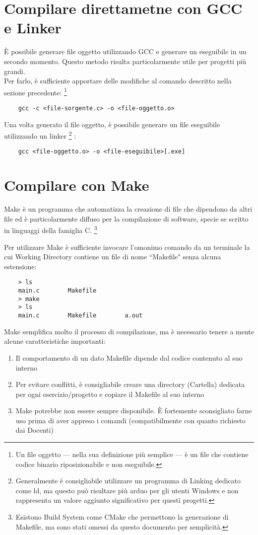 \documentclass{article}
\begin{document}
\section{Compilare direttametne con GCC e Linker}
È possibile generare file oggetto utilizzando GCC e generare un eseguibile in un secondo momento. Questo metodo risulta particolarmente utile per progetti più grandi.  \\
Per farlo, è sufficiente apportare delle modifiche al comando descritto nella sezione precedente:
\footnote{Un file oggetto — nella sua definizione più semplice — è un file che contiene codice binario riposizionabile e non eseguibile.}
\begin{verbatim}
    gcc -c <file-sorgente.c> -o <file-oggetto.o>
\end{verbatim}
Una volta generato il file oggetto, è possibile  generare un file eseguibile utilizzando un linker \footnote{Generalmente è consigliabile utilizzare un programma di Linking dedicato come ld, ma questo può risultare più arduo per gli utenti Windows e non rappresenta un valore aggiunto significativo per questi progetti.}
:
\begin{verbatim}
    gcc <file-oggetto.o> -o <file-eseguibile>[.exe]
\end{verbatim}

\section{Compilare con Make}
Make è un programma che automatizza la creazione di file che dipendono da altri file ed è particolarmente diffuso per la compilazione di software, specie se scritto in linguaggi della famiglia C. 
\footnote{Esistono Build System come CMake che permettono la generazione di Makefile, ma sono stati omessi da questo documento per semplicità.} \par
Per utilizzare Make è sufficiente invocare l'omonimo comando da un terminale la cui Working Directory contiene un file di nome ``Makefile" senza alcuna estensione:
\begin{verbatim}
    > ls
    main.c        Makefile
    > make
    > ls
    main.c        Makefile        a.out
\end{verbatim}


\noindent
Make semplifica molto il processo di compilazione, ma è necessario tenere a mente alcune caratteristiche importanti:
\begin{enumerate}
	\item Il comportamento di un dato Makefile dipende dal codice contenuto al suo interno
	\item Per evitare conflitti, è consigliabile creare una directory (Cartella) dedicata per ogni esercizio/progetto e copiare il Makefile al suo interno
	\item Make potrebbe non essere sempre disponibile. È fortemente sconsigliato farne uso prima di aver appreso i comandi (compatibilmente con quanto richiesto dai Docenti)
\end{enumerate}
\end{document}
